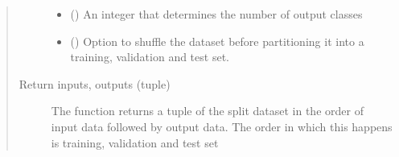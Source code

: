 \documentclass[letterpaper,10pt,english]{sphinxmanual}
\begin{document}
\begin{fulllineitems}
\begin{quote}
\begin{description}
\begin{itemize}
\item {} 
\sphinxstyleliteralstrong{\sphinxupquote{ (}}\sphinxstyleliteralstrong{\sphinxupquote{)}} (\sphinxstyleliteralemphasis{\sphinxupquote{(}}\sphinxstyleliteralemphasis{\sphinxupquote{)}}) \textendash{} An integer that determines the number of output classes

\item {} 
\sphinxstyleliteralstrong{\sphinxupquote{ (}}\sphinxstyleliteralstrong{\sphinxupquote{)}} (\sphinxstyleliteralemphasis{\sphinxupquote{(}}\sphinxstyleliteralemphasis{\sphinxupquote{)}}) \textendash{} Option to shuffle the dataset before partitioning it into a training, validation and test set.

\end{itemize}

\item[{Return inputs, outputs (tuple)}] \leavevmode
The function returns a tuple of the split dataset in the order of input data followed by output data.
The order in which this happens is training, validation and test set

\end{description}\end{quote}

\end{fulllineitems}

\end{document}
